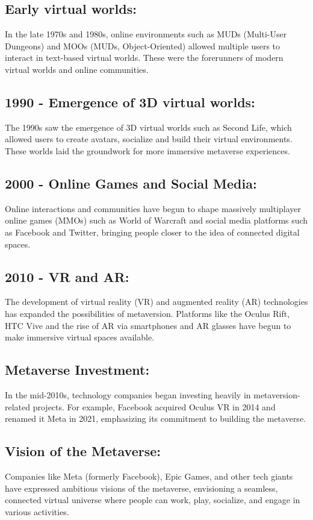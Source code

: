 \subsection{Early virtual worlds:}
In the late 1970s and 1980s, online environments such as MUDs (Multi-User Dungeons) and MOOs (MUDs, Object-Oriented) allowed multiple users to interact in text-based virtual worlds. These were the forerunners of modern virtual worlds and online communities.
\subsection{1990 - Emergence of 3D virtual worlds:}
The 1990s saw the emergence of 3D virtual worlds such as Second Life, which allowed users to create avatars, socialize and build their virtual environments. These worlds laid the groundwork for more immersive metaverse experiences.
\subsection{2000 - Online Games and Social Media:}
Online interactions and communities have begun to shape massively multiplayer online games (MMOs) such as World of Warcraft and social media platforms such as Facebook and Twitter, bringing people closer to the idea of connected digital spaces.
\subsection{2010 - VR and AR:}
The development of virtual reality (VR) and augmented reality (AR) technologies has expanded the possibilities of metaversion. Platforms like the Oculus Rift, HTC Vive and the rise of AR via smartphones and AR glasses have begun to make immersive virtual spaces available.
\subsection{Metaverse Investment:}
In the mid-2010s, technology companies began investing heavily in metaversion-related projects. For example, Facebook acquired Oculus VR in 2014 and renamed it Meta in 2021, emphasizing its commitment to building the metaverse.
\subsection{Vision of the Metaverse:}
Companies like Meta (formerly Facebook), Epic Games, and other tech giants have expressed ambitious visions of the metaverse, envisioning a seamless, connected virtual universe where people can work, play, socialize, and engage in various activities.
